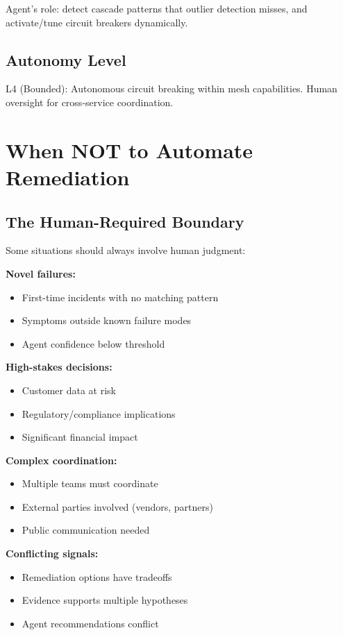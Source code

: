 Agent's role: detect cascade patterns that outlier detection misses, and activate/tune circuit breakers dynamically.

\subsection{Autonomy Level}

L4 (Bounded): Autonomous circuit breaking within mesh capabilities. Human oversight for cross-service coordination.

\section{When NOT to Automate Remediation}
\label{sec:when-not-automate}

\subsection{The Human-Required Boundary}
\label{subsec:human-boundary}

Some situations should always involve human judgment:

\textbf{Novel failures:}
\begin{itemize}
    \item First-time incidents with no matching pattern
    \item Symptoms outside known failure modes
    \item Agent confidence below threshold
\end{itemize}

\textbf{High-stakes decisions:}
\begin{itemize}
    \item Customer data at risk
    \item Regulatory/compliance implications
    \item Significant financial impact
\end{itemize}

\textbf{Complex coordination:}
\begin{itemize}
    \item Multiple teams must coordinate
    \item External parties involved (vendors, partners)
    \item Public communication needed
\end{itemize}

\textbf{Conflicting signals:}
\begin{itemize}
    \item Remediation options have tradeoffs
    \item Evidence supports multiple hypotheses
    \item Agent recommendations conflict
\end{itemize}

